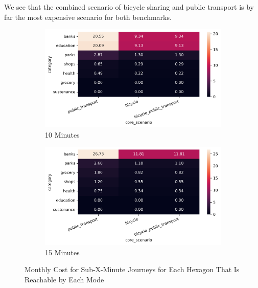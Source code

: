 We see that the combined scenario of bicycle sharing and public transport is by far the most expensive scenario for both benchmarks.




\begin{figure}
  \centering
  \begin{subfigure}[b]{0.45\textwidth}
    \centering
    \includegraphics[width=\textwidth]{Figures/results/monthly_costs/cost_all_reachable_in_10.png}
    \caption{10 Minutes}
    \label{fig:costs_all_reachable_10}
  \end{subfigure}
  \hfill
  \begin{subfigure}[b]{0.45\textwidth}
    \centering
    \includegraphics[width=\textwidth]{Figures/results/monthly_costs/cost_all_reachable_in_15.png}
    \caption{15 Minutes}
    \label{fig:costs_all_reachable_15}
  \end{subfigure}
  \caption{Monthly Cost for Sub-X-Minute Journeys for Each Hexagon That Is Reachable by Each Mode}
  \label{fig:costs_all_reachable_x}
\end{figure}
